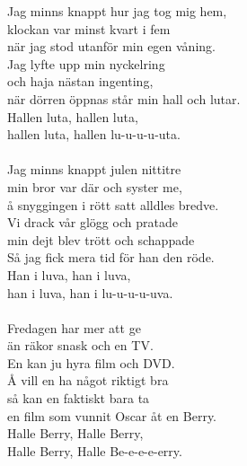 \documentclass[a6paper,10pt]{article}
\begin{document}
\setlength{\oddsidemargin}{-0.47in}
\noindent
\begin{center}
\end{center}
\begin{lyrics} 
\small Jag minns knappt hur jag tog mig hem, \\
klockan var minst kvart i fem \\
när jag stod utanför min egen våning. \\
Jag lyfte upp min nyckelring \\
och haja nästan ingenting, \\
när dörren öppnas står min hall och lutar. \\
Hallen luta, hallen luta, \\
hallen luta, hallen lu-u-u-u-uta. \\
\vspace{5pt}\\
Jag minns knappt julen nittitre \\
min bror var där och syster me, \\
å snyggingen i rött satt alldles bredve. \\
Vi drack vår glögg och pratade \\
min dejt blev trött och schappade \\
Så jag fick mera tid för han den röde. \\
Han i luva, han i luva, \\
han i luva, han i lu-u-u-u-uva. \\
\vspace{5pt}\\
Fredagen har mer att ge \\
än räkor snask och en TV. \\
En kan ju hyra film och DVD. \\
Å vill en ha något riktigt bra \\
så kan en faktiskt bara ta \\
en film som vunnit Oscar åt en Berry. \\
Halle Berry, Halle Berry, \\
Halle Berry, Halle Be-e-e-e-erry. \\
\end{lyrics}
\end{document}
